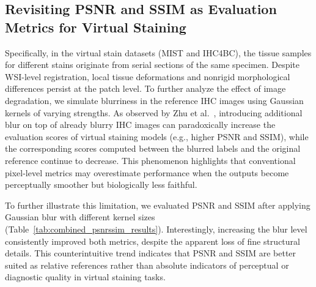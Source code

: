 \documentclass[journal,twoside,web]{ieeecolor}
\begin{document}
\subsection{Revisiting PSNR and SSIM as Evaluation Metrics for Virtual Staining}
\label{sec:discussion}
{
Specifically, in the virtual stain datasets (MIST and IHC4BC), the tissue samples for different stains originate from serial sections of the same specimen. Despite WSI-level registration, local tissue deformations and nonrigid morphological differences persist at the patch level. To further analyze the effect of image degradation, we simulate blurriness in the reference IHC images using Gaussian kernels of varying strengths. As observed by Zhu et al.~\cite{zhu2023breast}, introducing additional blur on top of already blurry IHC images can paradoxically increase the evaluation scores of virtual staining models (e.g., higher PSNR and SSIM), while the corresponding scores computed between the blurred labels and the original reference continue to decrease. This phenomenon highlights that conventional pixel-level metrics may overestimate performance when the outputs become perceptually smoother but biologically less faithful.
}

{
 To further illustrate this limitation, we evaluated PSNR and SSIM after applying Gaussian blur with different kernel sizes (Table~\ref{tab:combined_psnrssim_results}). Interestingly, increasing the blur level consistently improved both metrics, despite the apparent loss of fine structural details. This counterintuitive trend indicates that PSNR and SSIM are better suited as relative references rather than absolute indicators of perceptual or diagnostic quality in virtual staining tasks.
}
\end{document}
